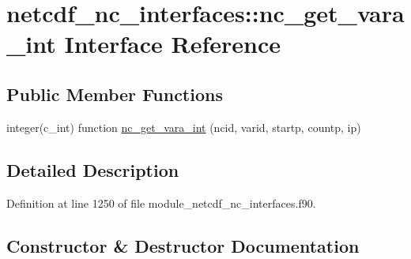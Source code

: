 \hypertarget{interfacenetcdf__nc__interfaces_1_1nc__get__vara__int}{}\section{netcdf\+\_\+nc\+\_\+interfaces\+:\+:nc\+\_\+get\+\_\+vara\+\_\+int Interface Reference}
\label{interfacenetcdf__nc__interfaces_1_1nc__get__vara__int}
\subsection*{Public Member Functions}
\begin{DoxyCompactItemize}
\item 
integer(c\+\_\+int) function \hyperlink{interfacenetcdf__nc__interfaces_1_1nc__get__vara__int_a15071a59b539aa2b20b02a9abae91ea3}{nc\+\_\+get\+\_\+vara\+\_\+int} (ncid, varid, startp, countp, ip)
\end{DoxyCompactItemize}


\subsection{Detailed Description}


Definition at line 1250 of file module\+\_\+netcdf\+\_\+nc\+\_\+interfaces.\+f90.



\subsection{Constructor \& Destructor Documentation}
\mbox{\label{interfacenetcdf__nc__interfaces_1_1nc__get__vara__int_a15071a59b539aa2b20b02a9abae91ea3}} 
